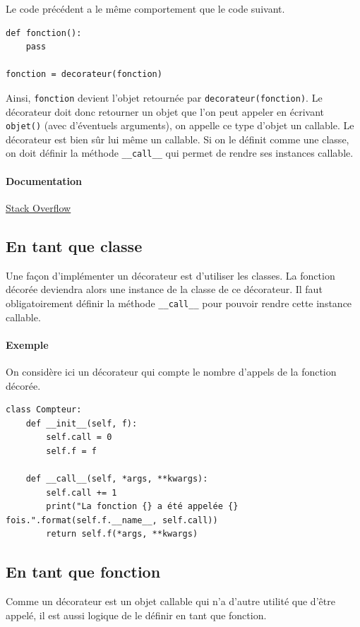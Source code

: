 \documentclass[a4paper, french, 10pt]{article}
\newcommand{\code}[1]{{\small\texttt{#1}}}
\begin{document}
Le code précédent a le même comportement que le code suivant.

\begin{verbatim}
def fonction():
    pass

fonction = decorateur(fonction)
\end{verbatim}

Ainsi, \code{fonction} devient l'objet retournée par \code{decorateur(fonction)}. Le décorateur doit donc retourner un objet que l'on peut appeler en écrivant \code{objet()} (avec d'éventuels arguments), on appelle ce type d'objet un \og callable\fg{}. Le décorateur est bien sûr lui même un callable. Si on le définit comme une classe, on doit définir la méthode \code{\_\_call\_\_} qui permet de rendre ses instances callable.

\paragraph{Documentation} \href{https://stackoverflow.com/questions/739654/how-to-make-a-chain-of-function-decorators/1594484#1594484}{Stack Overflow}

\subsection{En tant que classe}
Une façon d'implémenter un décorateur est d'utiliser les classes. La fonction décorée deviendra alors une instance de la classe de ce décorateur. Il faut obligatoirement définir la méthode \code{\_\_call\_\_} pour pouvoir rendre cette instance callable.

\paragraph{Exemple} On considère ici un décorateur qui compte le nombre d'appels de la fonction décorée.
\begin{verbatim}
class Compteur:
    def __init__(self, f):
        self.call = 0
        self.f = f

    def __call__(self, *args, **kwargs):
        self.call += 1
        print("La fonction {} a été appelée {} fois.".format(self.f.__name__, self.call))
        return self.f(*args, **kwargs)
\end{verbatim}
\subsection{En tant que fonction}
Comme un décorateur est un objet callable qui n'a d'autre utilité que d'être appelé, il est aussi logique de le définir en tant que fonction.
\end{document}
